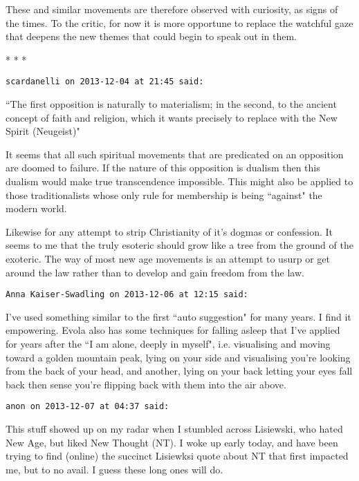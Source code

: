 These and similar movements are therefore observed with curiosity, as signs of the times. To the critic, for now it is more opportune to replace the watchful gaze that deepens the new themes that could begin to speak out in them.




\begin{center}* * *\end{center}

\begin{footnotesize}\begin{sffamily}



\texttt{scardanelli on 2013-12-04 at 21:45 said: }

``The first opposition is naturally to materialism; in the second, to the ancient concept of faith and religion, which it wants precisely to replace with the New Spirit (Neugeist)"

It seems that all such spiritual movements that are predicated on an opposition are doomed to failure. If the nature of this opposition is dualism then this dualism would make true transcendence impossible. This might also be applied to those traditionalists whose only rule for membership is being ``against" the modern world. 

Likewise for any attempt to strip Christianity of it's dogmas or confession. It seems to me that the truly esoteric should grow like a tree from the ground of the exoteric. The way of most new age movements is an attempt to usurp or get around the law rather than to develop and gain freedom from the law.


\hfill

\texttt{Anna Kaiser-Swadling on 2013-12-06 at 12:15 said: }

I've used something similar to the first ``auto suggestion" for many years. I find it empowering. Evola also has some techniques for falling asleep that I've applied for years after the ``I am alone, deeply in myself", i.e. visualising and moving toward a golden mountain peak, lying on your side and visualising you're looking from the back of your head, and another, lying on your back letting your eyes fall back then sense you're flipping back with them into the air above.


\hfill

\texttt{anon on 2013-12-07 at 04:37 said: }

This stuff showed up on my radar when I stumbled across Lisiewski, who hated New Age, but liked New Thought (NT). I woke up early today, and have been trying to find (online) the succinct Lisiewksi quote about NT that first impacted me, but to no avail. I guess these long ones will do. 


\end{sffamily}
\end{footnotesize}
